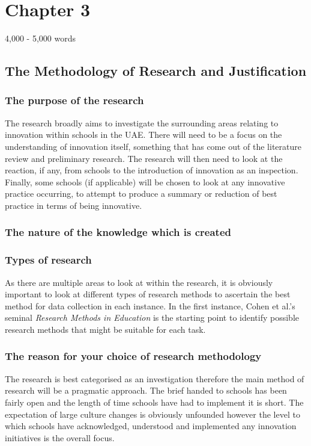 \section{Chapter 3}
4,000 - 5,000 words
\subsection{The Methodology of Research and Justification}

\subsubsection{The purpose of the research}
The research broadly aims to investigate the surrounding areas relating to innovation within schools in the UAE. There will need to be a focus on the understanding of innovation itself, something that has come out of the literature review and preliminary research. The research will then need to look at the reaction, if any, from schools to the introduction of innovation as an inspection. Finally, some schools (if applicable) will be chosen to look at any innovative practice occurring, to attempt to produce a summary or reduction of best practice in terms of being innovative.

\subsubsection{The nature of the knowledge which is created}

\subsubsection{Types of research}

As there are multiple areas to look at within the research, it is obviously important to look at different types of research methods to ascertain the best method for data collection in each instance. In the first instance, Cohen et al.'s seminal \textit{Research Methods in Education} \citep{Cohen2005} is the starting point to identify possible research methods that might be suitable for each task.



\subsubsection{The reason for your choice of research methodology}
The research is best categorised as an investigation therefore the main method of research will be a pragmatic approach. The brief handed to schools has been fairly open and the length of time schools have had to implement it is short. The expectation of large culture changes is obviously unfounded however the level to which schools have acknowledged, understood and implemented any innovation initiatives is the overall focus. 


